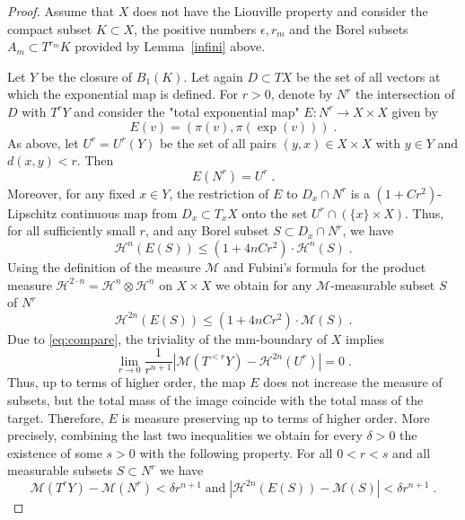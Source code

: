 \documentclass[12pt,leqno]{amsart}
\numberwithin{equation}{section}
\theoremstyle{definition}
\theoremstyle{remark}
\newcommand{\lref}[1]{Lemma~\ref{#1}}
\def\:{\colon}
\begin{document}
\begin{proof}
Assume that $X$ does not have the Liouville property and consider the compact subset $K \subset X$, the positive numbers $\epsilon, r_m$ and the Borel
subsets $A_m\subset T^{r_m} K$ provided by \lref{infini} above.

Let $Y$ be the closure of $B_1 (K)$.
Let again $D\subset TX$ be the set of all vectors at which the exponential map is defined.
  For $r>0$, denote  by $N^r$ the intersection of $D$ with $T^r Y$ and consider the "total exponential map"
$E\:N^r \to X\times X$ given by $$E(v)= (\pi (v), \pi (\exp (v))) \; .$$
 As above,  let $U^r =U^r(Y)$ be  the set of all
  pairs $(y,x) \in X\times X$ with $y\in Y$ and $d(x,y)<r$. Then
\begin{equation} \label{eq:image}
E(N^r) =U^r \; .
\end{equation}
Moreover, for any  fixed $x \in Y$, the restriction of $E$ to $D_x \cap N^r$ is
a $(1+ C r^2)$-Lipschitz continuous map from $D_x\subset T_xX$ onto the set  $U^r \cap (\{x \} \times X)$.
Thus, for all sufficiently small $r$, and any Borel subset $S\subset D_x \cap N^r$, we have
$$\mathcal H^n (E(S)) \leq (1+4n C r^2)\cdot  \mathcal H^n (S)\; .$$
 Using the definition of the measure $\mathcal M$ and  Fubini's formula for the product measure
$\mathcal H^{2\cdot n} =\mathcal H^n \otimes \mathcal H^n $ on $X\times X$ we obtain for any $\mathcal M$-measurable subset $S$ of $N^r$
\begin{equation} \label{eq:contract}
\mathcal H^{2n} (E(S)) \leq (1+4nC r^2) \cdot \mathcal M(S)\; .
\end{equation}
Due to \eqref{eq:compare}, the triviality of the mm-boundary of $X$ implies
$$\lim _{r\to 0} \frac 1 {r^{n+1} } |\mathcal M(T^{<r} Y) -\mathcal H^{2n} (U^r)| =0 \;.$$
 Thus, up to terms of higher order, the  map $E$ does not increase the measure of subsets, but the total mass of the image
coincide with the total mass of the target.
Thеrefore, $E$ is measure preserving up to terms of higher order.
More precisely,   combining the last two inequalities we obtain for every  $\delta >0$ the existence of some $s>0$ with the following property. For all $0<r<s$ and all measurable subsets $S\subset N^r$
	we have
	\begin{equation}  \label{eq:almostall}
	\mathcal M (T^r Y)- \mathcal M (N^r) < \delta r^{n+1} \;   \text{and}  \;   |\mathcal H^{2n} (E(S)) - \mathcal M  (S)|  < \delta r^{n+1} \;.
	\end{equation}

\end{proof}
\end{document}
